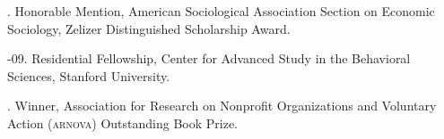 \documentclass[11pt]{article}
\begin{document}
% 
% 
% 
%   
% 
% 
% 
%   
% 
% 
% 
% 
% 
% 
% 
% 
% 
% 
% 

\bigskip

\medskip
  
. Honorable Mention, American Sociological Association Section on Economic Sociology, Zelizer Distinguished Scholarship Award.

-09. Residential Fellowship, Center for Advanced Study in the Behavioral Sciences, Stanford University.

. Winner, Association for Research on Nonprofit Organizations and Voluntary Action (\textsc{arnova}) Outstanding Book Prize.
\end{document}

